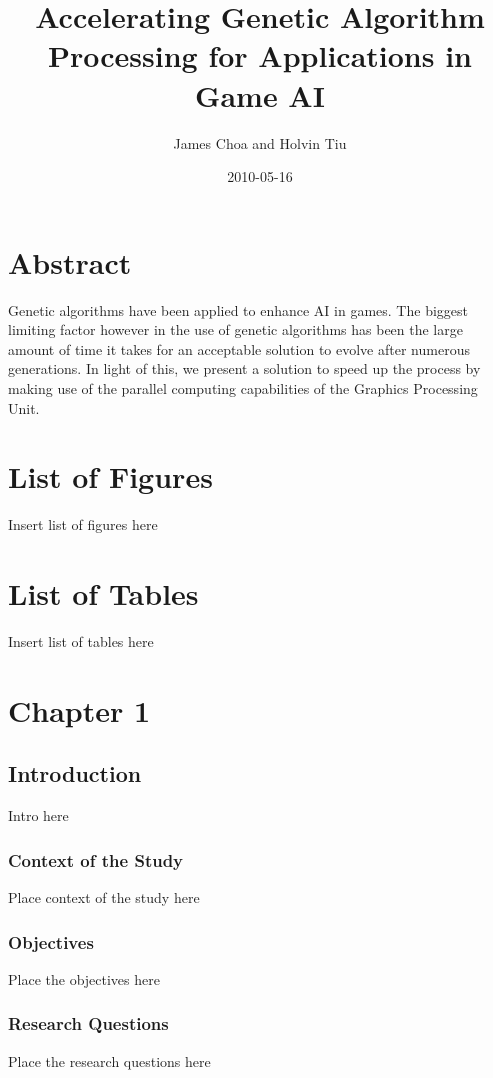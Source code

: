 \documentclass[letterpaper,10pt,titlepage]{article}
\author{James Choa and Holvin Tiu}
\title{Accelerating Genetic Algorithm Processing for Applications in Game AI}
\date{2010-05-16}
\begin{document}
\maketitle

\section*{Abstract}
Genetic algorithms have been applied to enhance AI in games. The biggest
limiting factor however in the use of genetic algorithms has been the large amount of 
time it takes for an acceptable solution to evolve after numerous generations.
In light of this, we present a solution to speed up the process by making use of the
parallel computing capabilities of the Graphics Processing Unit.

\pagebreak

\tableofcontents


\section*{List of Figures}
Insert list of figures here



\section*{List of Tables}
Insert list of tables here



\section*{Chapter 1}
\subsection*{Introduction}
Intro here


\subsubsection*{Context of the Study}
Place context of the study here


\subsubsection*{Objectives}
Place the objectives here


\subsubsection*{Research Questions}
Place the research questions here
\end{document}
